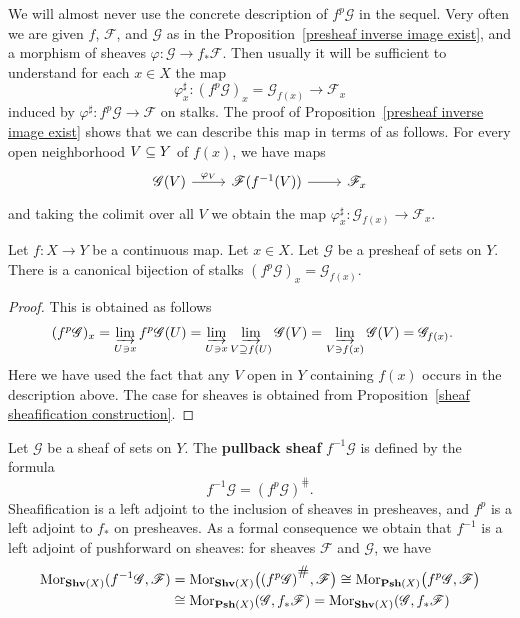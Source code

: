 \begin{remark}
We will almost never use the concrete description of $f^{p}\mathscr{G}$ in the sequel. Very often we are given $f$, $\mathscr{F}$, and $\mathscr{G}$ as in the Proposition~\ref{presheaf inverse image exist}, and a morphism of sheaves $\varphi:\mathscr{G}\to f_*\mathscr{F}$. Then usually it will be sufficient to understand for each $x\in X$ the map
\[\varphi^{\sharp}_x:(f^{p}\mathscr{G})_x=\mathscr{G}_{f(x)}\to\mathscr{F}_x\]
induced by $\varphi^{\sharp}:f^{p}\mathscr{G}\to\mathscr{F}$ on stalks. The proof of Proposition~\ref{presheaf inverse image exist} shows that we can describe this map in terms of as follows. For every open neighborhood $V\subseteq Y$ of $f(x)$, we have maps
\[\begin{tikzcd}
\mathscr{G}(V)\ar[r,"\varphi_V"]&\mathscr{F}(f^{-1}(V))\ar[r]&\mathscr{F}_x
\end{tikzcd}\]
and taking the colimit over all $V$ we obtain the map $\varphi^{\sharp}_x:\mathscr{G}_{f(x)}\to\mathscr{F}_x$.
\end{remark}
\begin{proposition}\label{pull back stalk}
Let $f:X\to Y$ be a continuous map. Let $x\in X$. Let $\mathscr{G}$ be a presheaf of sets on $Y$. There is a canonical bijection of stalks $(f^{p}\mathscr{G})_x=\mathscr{G}_{f(x)}$.
\end{proposition}
\begin{proof}
This is obtained as follows
\begin{align*}
(f^{p}\mathscr{G})_x&=\varinjlim\limits_{U\ni x}f^{p}\mathscr{G}(U)=\varinjlim\limits_{U\ni x}\varinjlim\limits_{V\supseteq f(U)}\mathscr{G}(V)=\varinjlim\limits_{V\ni f(x)}\mathscr{G}(V)=\mathscr{G}_{f(x)}.
\end{align*}
Here we have used the fact that any $V$ open in $Y$ containing $f(x)$ occurs in the description above. The case for sheaves is obtained from Proposition~\ref{sheaf sheafification construction}.
\end{proof}
Let $\mathscr{G}$ be a sheaf of sets on $Y$. The \textbf{pullback sheaf} $f^{-1}\mathscr{G}$ is defined by the formula
\[f^{-1}\mathscr{G}=(f^{p}\mathscr{G})^{\hash}.\]
Sheafification is a left adjoint to the inclusion of sheaves in presheaves, and $f^{p}$ is a left adjoint to $f_*$ on presheaves. As a formal consequence we obtain that $f^{-1}$ is a left adjoint of pushforward on sheaves: for sheaves $\mathscr{F}$ and $\mathscr{G}$, we have
\begin{align*}
\Mor_{\mathbf{Shv}(X)}(f^{-1}\mathscr{G},\mathscr{F})&=\Mor_{\mathbf{Shv}(X)}\big((f^{p}\mathscr{G})^{\hash},\mathscr{F}\big)\cong\Mor_{\mathbf{Psh}(X)}\big(f^{p}\mathscr{G},\mathscr{F}\big)\\
&\cong\Mor_{\mathbf{Psh}(X)}(\mathscr{G},f_*\mathscr{F})=\Mor_{\mathbf{Shv}(X)}(\mathscr{G},f_*\mathscr{F})
\end{align*}
